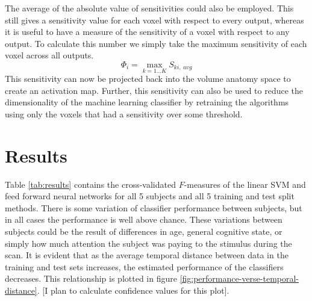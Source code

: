 \documentclass[preprint,authoryear,12pt]{elsarticle}
\begin{document}
The average of the absolute value of sensitivities could also be employed.
This still gives a sensitivity value for each voxel with respect to every output, whereas it is useful to have a measure of the sensitivity of a voxel with respect to any output.
To calculate this number we simply take the maximum sensitivity of each voxel across all outputs.
\begin{equation}
\Phi_{i} = \max_{k=1 \dots K}{S_{ki,~avg}}
\end{equation}
This sensitivity can now be projected back into the volume anatomy space to create an activation map.
Further, this sensitivity can also be used to reduce the dimensionality of the machine learning classifier by retraining the algorithms using only the voxels that had a sensitivity over some threshold.

\section{Results}
Table \ref{tab:results} contains the cross-validated $F$-measures of the linear SVM and feed forward neural networks for all 5 subjects and all 5 training and test split methods.
There is some variation of classifier performance between subjects, but in all cases the performance is well above chance. 
These variations between subjects could be the result of differences in age, general cognitive state, or simply how much attention the subject was paying to the stimulus during the scan.
It is evident that as the average temporal distance between data in the training and test sets increases, the estimated performance of the classifiers decreases.
This relationship is plotted in figure \ref{fig:performance-verse-temporal-distance}.
[I plan to calculate confidence values for this plot].
\end{document}
